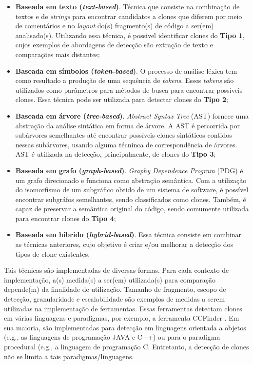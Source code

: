 \begin{itemize}
	\item \textbf{Baseada em texto (\textit{text-based})}. Técnica que consiste na combinação de textos e de \textit{strings} para encontrar candidatos a clones que diferem por meio de comentários e no \textit{layout} do(s) fragmento(s) de código a ser(em) analisado(s). Utilizando essa técnica, é possivel identificar clones do \textbf{Tipo 1}, cujos exemplos de abordagens de detecção são extração de texto e comparações mais distantes;
	
	\item \textbf{Baseada em símbolos (\textit{token-based})}. O processo de análise léxica tem como resultado a produção de uma sequência de \textit{tokens}. Esses \textit{tokens} são utilizados como parâmetros para métodos de busca para encontrar possíveis clones. Essa técnica pode ser utilizada para detectar clones do \textbf{Tipo 2};
	
	\item \textbf{Baseada em árvore (\textit{tree-based})}. \textit{Abstract Syntax Tree} (AST) fornece uma abstração da análise sintática em forma de árvore. A AST é percorrida por subárvores semelhantes até encontrar possíveis clones sintáticos contidos nessas subárvores, usando alguma técninca de correspondência de árvores. AST é utilizada na detecção, principalmente, de clones do \textbf{Tipo 3};
	
	\item \textbf{Baseada em grafo (\textit{graph-based})}. \textit{Graphy Dependence Program} (PDG) é um grafo direcionado e funciona como abstração semântica. Com a utilização do isomorfismo de um subgráfico obtido de um sistema de software, é possível encontrar subgráfos semelhantes, sendo classificados como clones. Também, é capaz de preservar a semântica original do código, sendo comumente utilizada para encontrar clones do \textbf{Tipo 4};
	
	\item \textbf{Baseada em híbrido (\textit{hybrid-based})}. Essa técnica consiste em combinar as técnicas anteriores, cujo objetivo é criar e/ou melhorar a detecção dos tipos de clone existentes.
\end{itemize}

Tais técnicas são implementadas de diversas formas. Para cada contexto de implementação, a(s) medida(s) a ser(em) utilizada(s) para comparação depende(m) da finalidade de utilização. Tamanho de fragmento, escopo de detecção, granularidade e escalabilidade são exemplos de medidas a serem utilizadas na implementação de ferramentas. Essas ferramentas detectam clones em várias linguagens e paradigmas, por exemplo, a ferramenta CCFinder \cite{Kamiya2002}. Em sua maioria, são implementadas para detecção em linguagens orientada a objetos (e.g., as linguagens de programação JAVA e C++) \cite{Kamiya2002}\cite{Lin2014}\cite{Yuan2011} ou para o paradigma procedural (e.g., a linguagem de programação C. Entretanto, a detecção de clones não se limita a tais paradigmas/linguagens.

